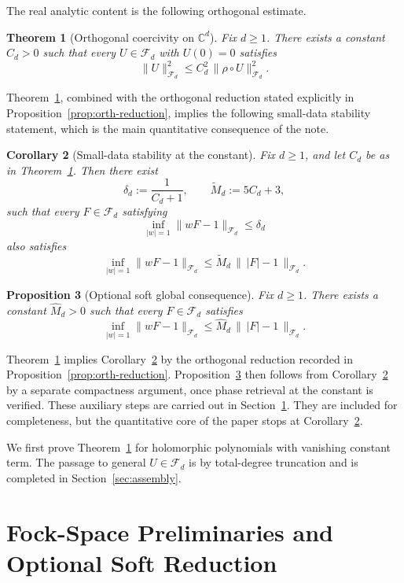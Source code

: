 \documentclass[11pt]{amsart}
\newtheorem{theorem}{Theorem}[section]
\newtheorem{proposition}[theorem]{Proposition}
\newtheorem{corollary}[theorem]{Corollary}
\theoremstyle{remark}
\newcommand{\C}{\mathbb{C}}
\newcommand{\abs}[1]{\lvert #1 \rvert}
\newcommand{\norm}[1]{\lVert #1 \rVert}
\newcommand{\rhoFn}{\rho}
\newcommand{\Fd}{\mathcal{F}_d}
\begin{document}
The real analytic content is the following orthogonal estimate.

\begin{theorem}[Orthogonal coercivity on $\C^d$]\label{thm:orthog}
Fix $d \ge 1$.  There exists a constant $C_d > 0$ such that every
$U \in \Fd$ with $U(0) = 0$ satisfies
\[
\norm{U}_{\Fd}^2
\le
C_d^2\, \norm{\rhoFn \circ U}_{\Fd}^2.
\]
\end{theorem}

\noindent
Theorem~\ref{thm:orthog}, combined with the orthogonal reduction stated
explicitly in Proposition~\ref{prop:orth-reduction}, implies the following
small-data stability statement, which is the main quantitative consequence
of the note.

\begin{corollary}[Small-data stability at the constant]\label{cor:small}
Fix $d \ge 1$, and let $C_d$ be as in Theorem~\ref{thm:orthog}.  Then there
exist
\[
\delta_d := \frac{1}{C_d + 1},
\qquad
\widetilde M_d := 5 C_d + 3,
\]
such that every $F \in \Fd$ satisfying
\[
\inf_{\abs{w}=1}\norm{wF - 1}_{\Fd}
\le
\delta_d
\]
also satisfies
\[
\inf_{\abs{w}=1}\norm{wF - 1}_{\Fd}
\le
\widetilde M_d\, \bigl\|\, \abs{F} - 1 \,\bigr\|_{\Fd}.
\]
\end{corollary}

\begin{proposition}[Optional soft global consequence]\label{prop:soft-global}
Fix $d \ge 1$.  There exists a constant $\widehat M_d > 0$ such that every
$F \in \Fd$ satisfies
\[
\inf_{\abs{w}=1}\norm{wF - 1}_{\Fd}
\le
\widehat M_d\, \bigl\|\, \abs{F} - 1 \,\bigr\|_{\Fd}.
\]
\end{proposition}

Theorem~\ref{thm:orthog} implies Corollary~\ref{cor:small} by the
orthogonal reduction recorded in Proposition~\ref{prop:orth-reduction}.
Proposition~\ref{prop:soft-global} then follows from
Corollary~\ref{cor:small} by a separate compactness argument, once phase
retrieval at the constant is verified.  These auxiliary steps are carried
out in Section~\ref{sec:prelim-local}.  They are included for completeness,
but the quantitative core of the paper stops at
Corollary~\ref{cor:small}.

We first prove Theorem~\ref{thm:orthog} for holomorphic polynomials with
vanishing constant term.  The passage to general $U \in \Fd$ is by
total-degree truncation and is completed in Section~\ref{sec:assembly}.

\section{Fock-Space Preliminaries and Optional Soft Reduction}\label{sec:prelim-local}
\end{document}
